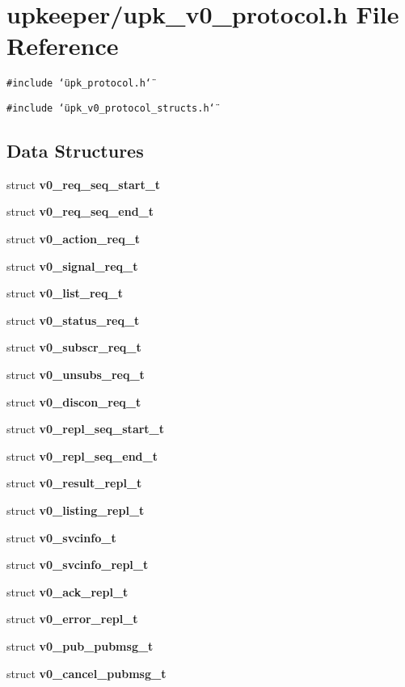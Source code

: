 \section{upkeeper/upk\_\-v0\_\-protocol.h File Reference}
\label{upk__v0__protocol_8h}
{\tt \#include \char`\"{}upk\_\-protocol.h\char`\"{}}\par
{\tt \#include \char`\"{}upk\_\-v0\_\-protocol\_\-structs.h\char`\"{}}\par
\subsection*{Data Structures}
\begin{CompactItemize}
\item 
struct \bf{v0\_\-req\_\-seq\_\-start\_\-t}
\item 
struct \bf{v0\_\-req\_\-seq\_\-end\_\-t}
\item 
struct \bf{v0\_\-action\_\-req\_\-t}
\item 
struct \bf{v0\_\-signal\_\-req\_\-t}
\item 
struct \bf{v0\_\-list\_\-req\_\-t}
\item 
struct \bf{v0\_\-status\_\-req\_\-t}
\item 
struct \bf{v0\_\-subscr\_\-req\_\-t}
\item 
struct \bf{v0\_\-unsubs\_\-req\_\-t}
\item 
struct \bf{v0\_\-discon\_\-req\_\-t}
\item 
struct \bf{v0\_\-repl\_\-seq\_\-start\_\-t}
\item 
struct \bf{v0\_\-repl\_\-seq\_\-end\_\-t}
\item 
struct \bf{v0\_\-result\_\-repl\_\-t}
\item 
struct \bf{v0\_\-listing\_\-repl\_\-t}
\item 
struct \bf{v0\_\-svcinfo\_\-t}
\item 
struct \bf{v0\_\-svcinfo\_\-repl\_\-t}
\item 
struct \bf{v0\_\-ack\_\-repl\_\-t}
\item 
struct \bf{v0\_\-error\_\-repl\_\-t}
\item 
struct \bf{v0\_\-pub\_\-pubmsg\_\-t}
\item 
struct \bf{v0\_\-cancel\_\-pubmsg\_\-t}
\end{CompactItemize}
